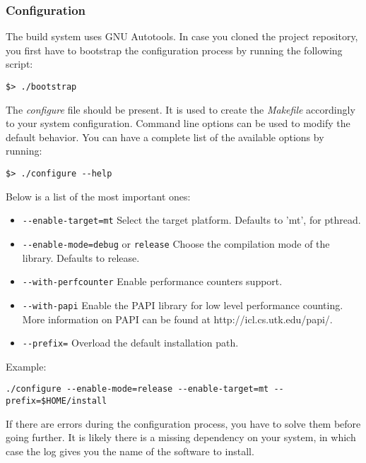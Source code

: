\subsubsection{Configuration}
The build system uses GNU Autotools.
In case you cloned the project repository, you first have to bootstrap the
configuration process by running the following script:
\begin{verbatim}
$> ./bootstrap
\end{verbatim}
The \textit{configure} file should be present. It is used to create the
\textit{Makefile} accordingly to your system configuration. Command line
options can be used to modify the default behavior. You can have a complete
list of the available options by running:
\begin{verbatim}
$> ./configure --help
\end{verbatim}



Below is a list of the most important ones:
\begin{itemize} %
\item \verb+--enable-target=mt+\newline
Select the target platform. Defaults to 'mt', for pthread.
\item \verb+--enable-mode=debug+ or \verb+release+\newline
Choose the compilation mode of the library. Defaults to release.
\item \verb+--with-perfcounter+\newline
Enable performance counters support.
\item \verb+--with-papi+\newline
Enable the PAPI library for low level performance counting.
More information on PAPI can be found at http://icl.cs.utk.edu/papi/.
\item \verb+--prefix=+\newline
Overload the default installation path.
\end{itemize} %
Example:

\begin{verbatim}
./configure --enable-mode=release --enable-target=mt --prefix=$HOME/install
\end{verbatim}
If there are errors during the configuration process, you have to solve
them before going further. It is likely there is a missing dependency on your
system, in which case the log gives you the name of the software to install.

